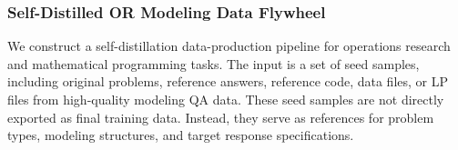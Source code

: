 



\subsubsection{Self-Distilled OR Modeling Data Flywheel}
\label{subsec:sft_dataset_construction}
\label{subsec:sft_ir_flywheel}

We construct a self-distillation data-production pipeline for operations research and mathematical programming tasks. The input is a set of seed samples, including original problems, reference answers, reference code, data files, or LP files from high-quality modeling QA data. These seed samples are not directly exported as final training data. Instead, they serve as references for problem types, modeling structures, and target response specifications.

